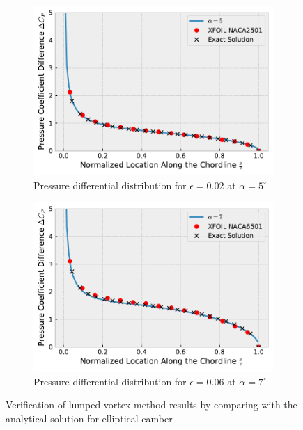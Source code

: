 \begin{figure}[h]
  \centering
  \begin{subfigure}{.5\textwidth}
    \centering
    \captionsetup{width=.8\linewidth}
    \includegraphics[width=.9\linewidth]{static/thin_airfoil_verification_a5.pdf}
    \caption{\centering Pressure differential distribution for $\epsilon = 0.02$ at $\alpha = 5^{\circ}$}
    \label{fig:thin_verif1}
  \end{subfigure}%
  \begin{subfigure}{.5\textwidth}
    \centering
    \captionsetup{width=.8\linewidth}
    \includegraphics[width=.9\linewidth]{static/thin_airfoil_verification_a7.pdf}
    \caption{\centering Pressure differential distribution for $\epsilon = 0.06$ at $\alpha = 7^{\circ}$}
    \label{fig:thin_verif2}
  \end{subfigure}
  \caption{\centering Verification of lumped vortex method results by comparing with the analytical solution for elliptical camber \cite{katz_plotkin}}
  \label{fig:thin_verif}
\end{figure}

